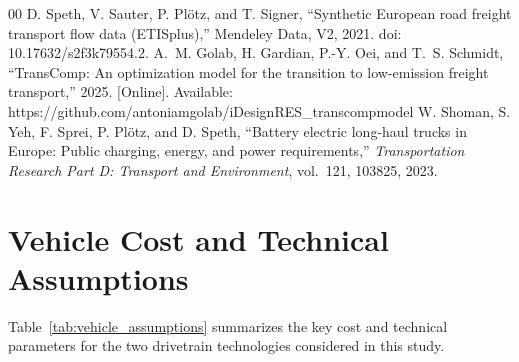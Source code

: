 \documentclass[conference]{IEEEtran}
\begin{document}
\begin{thebibliography}{00}
 D. Speth, V. Sauter, P. Pl\"otz, and T. Signer, ``Synthetic European road freight transport flow data (ETISplus),'' Mendeley Data, V2, 2021. doi: 10.17632/s2f3k79554.2.
 A.~M. Golab, H. Gardian, P.-Y. Oei, and T.~S. Schmidt, ``TransComp: An optimization model for the transition to low-emission freight transport,'' 2025. [Online]. Available: https://github.com/antoniamgolab/iDesignRES\_transcompmodel
 W. Shoman, S. Yeh, F. Sprei, P. Pl\"otz, and D. Speth, ``Battery electric long-haul trucks in Europe: Public charging, energy, and power requirements,'' \emph{Transportation Research Part D: Transport and Environment}, vol.~121, 103825, 2023.
\end{thebibliography}

\appendix
\section{Vehicle Cost and Technical Assumptions}

Table~\ref{tab:vehicle_assumptions} summarizes the key cost and technical parameters for the two drivetrain technologies considered in this study.
\end{document}
